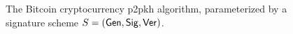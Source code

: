 \begin{figure}[t]
\begin{algorithm}[H]
    \caption{\label{alg.bitcoin} The Bitcoin cryptocurrency p2pkh algorithm,
    parameterized by a signature scheme $S = (\mathsf{Gen}, \mathsf{Sig}, \mathsf{Ver})$.}
    \begin{algorithmic}[1]
            \State{}
        \EndFunction
            \State{}
        \EndFunction
        \vskip8pt
    \end{algorithmic}
\end{algorithm}
\end{figure}
